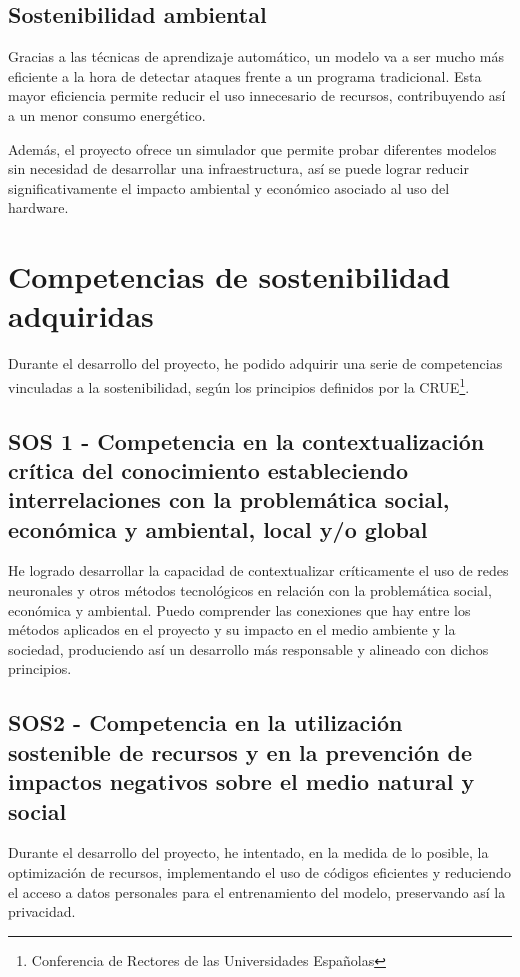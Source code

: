 \subsection{Sostenibilidad ambiental}
\label{subsec:Ambiental}
Gracias a las técnicas de aprendizaje automático, un modelo va a ser mucho más eficiente a la hora de detectar ataques frente a un programa tradicional. Esta mayor eficiencia permite reducir el uso innecesario de recursos, contribuyendo así a un menor consumo energético.

Además, el proyecto ofrece un simulador que permite probar diferentes modelos sin necesidad de desarrollar una infraestructura, así se puede lograr reducir significativamente el impacto ambiental y económico asociado al uso del hardware.

\section{Competencias de sostenibilidad adquiridas}
\label{sec:Competencias}
Durante el desarrollo del proyecto, he podido adquirir una serie de competencias vinculadas a la sostenibilidad, según los principios definidos por la CRUE\footnote{Conferencia de Rectores de las Universidades Españolas}.

\subsection{SOS 1 - Competencia en la contextualización crítica del conocimiento estableciendo interrelaciones con la problemática social, económica y ambiental, local y/o global}
\label{subsec:SOS1}
He logrado desarrollar la capacidad de contextualizar críticamente el uso de redes neuronales y otros métodos tecnológicos en relación con la problemática social, económica y ambiental. Puedo comprender las conexiones que hay entre los métodos aplicados en el proyecto y su impacto en el medio ambiente y la sociedad, produciendo así un desarrollo más responsable y alineado con dichos principios.

\subsection{SOS2 - Competencia en la utilización sostenible de recursos y en la prevención de impactos negativos sobre el medio natural y social}
\label{subsec:SOS2}
Durante el desarrollo del proyecto, he intentado, en la medida de lo posible, la optimización de recursos, implementando el uso de códigos eficientes y reduciendo el acceso a datos personales para el entrenamiento del modelo, preservando así la privacidad.


